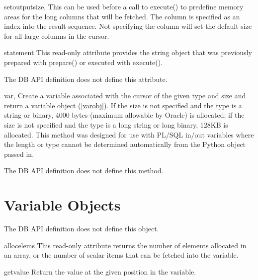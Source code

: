 \documentclass{manual}
\begin{document}
\begin{funcdesc}{setoutputsize}{, }
  This can be used before a call to execute() to predefine memory areas for the
  long columns that will be fetched. The column is specified as an index into
  the result sequence. Not specifying the column will set the default size for
  all large columns in the cursor.
\end{funcdesc}

\begin{datadesc}{statement}
  This read-only attribute provides the string object that was previously
  prepared with prepare() or executed with execute().

   The DB API definition does not define this attribute.
\end{datadesc}

\begin{funcdesc}{var}{, }
  Create a variable associated with the cursor of the given type and size and
  return a variable object (\ref{varobj}). If the size is not specified and the
  type is a string or binary, 4000 bytes (maximum allowable by Oracle) is
  allocated; if the size is not specified and the type is a long string or long
  binary, 128KB is allocated. This method was designed for use with PL/SQL
  in/out variables where the length or type cannot be determined automatically
  from the Python object passed in.

   The DB API definition does not define this method.
\end{funcdesc}

\chapter{Variable Objects\label{varobj}}

 The DB API definition does not define this object.

\begin{datadesc}{allocelems}
  This read-only attribute returns the number of elements allocated in an
  array, or the number of scalar items that can be fetched into the variable.
\end{datadesc}

\begin{funcdesc}{getvalue}{}
  Return the value at the given position in the variable.
\end{funcdesc}
\end{document}
